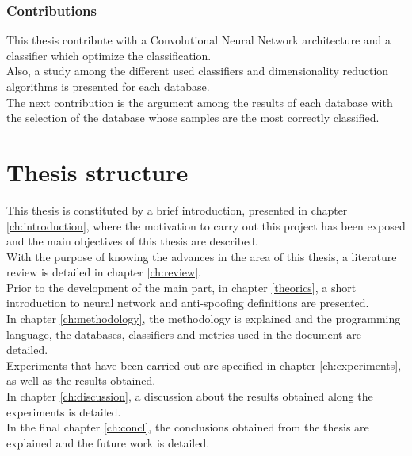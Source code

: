 \subsubsection{Contributions}
This thesis contribute with a Convolutional Neural Network architecture and a classifier which optimize the classification.\\

Also, a study among the different used classifiers and dimensionality reduction algorithms is presented for each database.\\

The next contribution is the argument among the results of each database with the selection of the database whose samples are the most correctly classified.\\

\section{Thesis structure}
This thesis is constituted by a brief introduction, presented in chapter \ref{ch:introduction}, where the motivation to carry out this project has been exposed and the main objectives of this thesis are described.\\

With the purpose of knowing the advances in the area of this thesis, a literature review is detailed in chapter \ref{ch:review}.\\

Prior to the development of the main part, in chapter \ref{theorics}, a short introduction to neural network and anti-spoofing definitions are presented.\\

In chapter \ref{ch:methodology}, the methodology is explained and the programming language, the databases, classifiers and metrics used in the document are detailed.\\

Experiments that have been carried out are specified in chapter \ref{ch:experiments}, as well as the results obtained.\\


In chapter \ref{ch:discussion}, a discussion about the results obtained along the experiments is detailed.\\

In the final chapter \ref{ch:concl}, the conclusions obtained from the thesis are explained and the future work is detailed.\\
